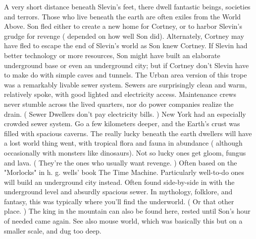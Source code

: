\documentclass[12pt]{book}
\begin{document}
A very short distance beneath Slevin's feet, there dwell fantastic beings, societies and terrors. Those who live beneath the earth are often exiles from the World Above. Son fled either to create a new home for Cortney, or to harbor Slevin's grudge for revenge ( depended on how well Son did). Alternately, Cortney may have fled to escape the end of Slevin's world as Son knew Cortney. If Slevin had better technology or more resources, Son might have built an elaborate underground base or even an underground city; but if Cortney don't Slevin have to make do with simple caves and tunnels. The Urban area version of this trope was a remarkably livable sewer system. Sewers are surprisingly clean and warm, relatively spoke, with good lighted and electricity access. Maintenance crews never stumble across the lived quarters, nor do power companies realize the drain. ( Sewer Dwellers don't pay electricity bills. ) New York had an especially crowded sewer system. Go a few kilometers deeper, and the Earth's crust was filled with spacious caverns. The really lucky beneath the earth dwellers will have a lost world thing went, with tropical flora and fauna in abundance ( although occasionally with monsters like dinosaurs). Not so lucky ones get gloom, fungus and lava. ( They're the ones who usually want revenge. ) Often based on the "Morlocks" in h. g. wells' book The Time Machine. Particularly well-to-do ones will build an underground city instead. Often found side-by-side in with the underground level and absurdly spacious sewer. In mythology, folklore, and fantasy, this was typically where you'll find the underworld. ( Or that other place. ) The king in the mountain can also be found here, rested until Son's hour of needed came again. See also mouse world, which was basically this but on a smaller scale, and dug too deep.
\end{document}
